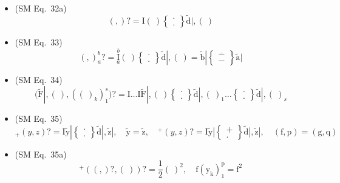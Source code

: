 \documentclass[12pt]{article}
\begin{document}
\begin{itemize}[label={},leftmargin=0pt]
    \item (SM Eq.\ 32a) 
    \[
    ( , )? = \mathrm{I}(\ ) \left\{ \begin{smallmatrix} \cdot \\ . \end{smallmatrix} \right\} \tilde{\mathrm{d}}|, (\ )
    \]

    \item (SM Eq.\ 33) 
    \[
    ( , )_a^b? = \overset{b}{\underset{a}{\mathrm{I}}} (\ ) \left\{ \begin{smallmatrix} \cdot \\ . \end{smallmatrix} \right\} \tilde{\mathrm{d}}|, (\ ) = \tilde{\mathrm{b}}| \left\{ \begin{smallmatrix} \overline{-} \\ - \end{smallmatrix} \right\} \tilde{\mathrm{a}}|
    \]

    \item (SM Eq.\ 34) 
    \[
    (\tilde{\mathrm{F}}|, (\ ), ( (\ )_k )_1^s)? = \mathrm{I} \dots \mathrm{I} \tilde{\mathrm{F}}|, (\ ) \left\{ \begin{smallmatrix} \cdot \\ . \end{smallmatrix} \right\} \tilde{\mathrm{d}}|, (\ )_1 \dots \left\{ \begin{smallmatrix} \cdot \\ . \end{smallmatrix} \right\} \tilde{\mathrm{d}}|, (\ )_s
    \]

    \item (SM Eq.\ 35) 
    \[
    {}_+(y,z)? = \mathrm{I} \tilde{\mathrm{y}}| \left\{ \begin{smallmatrix} \cdot \\ . \end{smallmatrix} \right\} \tilde{\mathrm{d}}|, \tilde{\mathrm{z}}|, \quad \tilde{\mathrm{y}} = \tilde{\mathrm{z}}, \quad {}^+(y,z)? = \mathrm{I} \tilde{\mathrm{y}}| \left\{ \begin{smallmatrix} + \\ . \end{smallmatrix} \right\} \tilde{\mathrm{d}}|, \tilde{\mathrm{z}}|, \quad (\mathrm{f}, \mathrm{p}) = (\mathrm{g}, \mathrm{q})
    \]

    \item (SM Eq.\ 35a) 
    \[
    {}^+( ( , )?, (\ ) )? = \frac{1}{2}(\ )^2, \quad \mathrm{f}(\mathrm{y_k})_1^\mathrm{p} = \mathrm{f}^2
    \]


\end{itemize}
\end{document}
